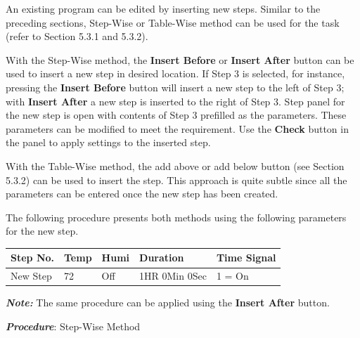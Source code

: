 An existing program can be edited by inserting new steps. Similar to the
preceding sections, Step-Wise or Table-Wise method can be used for the
task (refer to Section 5.3.1 and 5.3.2).

With the Step-Wise method, the \textbf{Insert Before} or \textbf{Insert
After} button can be used to insert a new step in desired location. If
Step 3 is selected, for instance, pressing the \textbf{Insert Before}
button will insert a new step to the left of Step 3; with \textbf{Insert
After} a new step is inserted to the right of Step 3. Step panel for the
new step is open with contents of Step 3 prefilled as the parameters.
These parameters can be modified to meet the requirement. Use the
\textbf{Check} button in the panel to apply settings to the inserted
step.

With the Table-Wise method, the add above or add below button (see
Section 5.3.2) can be used to insert the step. This approach is quite
subtle since all the parameters can be entered once the new step has
been created.

The following procedure presents both methods using the following
parameters for the new step.

\begin{longtable}[]{@{}lllll@{}}
\toprule
Step No. & Temp & Humi & Duration & Time Signal\tabularnewline
\midrule
\endhead
New Step & 72 & Off & 1HR 0Min 0Sec & 1 = On\tabularnewline
\bottomrule
\end{longtable}

\textbf{\emph{Note:}} The same procedure can be applied using the
\textbf{Insert After} button.

\textbf{\emph{Procedure}}: Step-Wise Method


